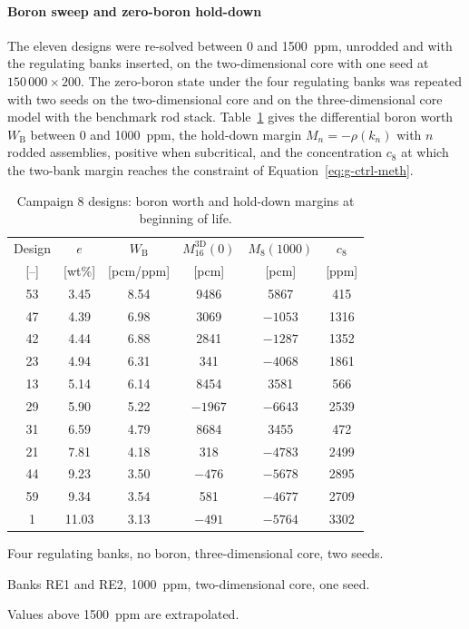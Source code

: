 \paragraph{Boron sweep and zero-boron hold-down}
\label{sec:res-c8-boron}\label{sec:res-c8-zeroboron}

The eleven designs were re-solved between 0 and \SI{1500}{ppm},
unrodded and with the regulating banks inserted, on the
two-dimensional core with one seed at $150\,000\times200$. The
zero-boron state under the four regulating banks was repeated with two
seeds on the two-dimensional core and on the three-dimensional core
model with the benchmark rod stack. Table~\ref{tab:c8-post-boron} gives
the differential boron worth $W_\mathrm{B}$ between 0 and
\SI{1000}{ppm}, the hold-down margin $M_n = -\rho(k_n)$ with $n$
rodded assemblies, positive when subcritical, and the concentration
$c_8$ at which the two-bank margin reaches the constraint of
Equation~\eqref{eq:g-ctrl-meth}.

\begin{table}[htbp]
  \centering
  \small
  \begin{threeparttable}
  \caption{Campaign 8 designs: boron worth and hold-down margins at beginning of life.}
  \label{tab:c8-post-boron}
  \begin{tabular}{@{}cccccc@{}}
    \toprule
    Design & $e$ & $W_\mathrm{B}$ & $M_{16}^\mathrm{3D}(0)$\tnote{a} &
      $M_8(1000)$\tnote{b} & $c_8$\tnote{c} \\
    {[--]} & [wt\%] & [pcm/ppm] & [pcm] & [pcm] & [ppm] \\
    \midrule
    53 & 3.45  & 8.54 & 9486    & 5867    & 415 \\
    47 & 4.39  & 6.98 & 3069    & $-1053$ & 1316 \\
    42 & 4.44  & 6.88 & 2841    & $-1287$ & 1352 \\
    23 & 4.94  & 6.31 & 341     & $-4068$ & 1861 \\
    13 & 5.14  & 6.14 & 8454    & 3581    & 566 \\
    29 & 5.90  & 5.22 & $-1967$ & $-6643$ & 2539 \\
    31 & 6.59  & 4.79 & 8684    & 3455    & 472 \\
    21 & 7.81  & 4.18 & 318     & $-4783$ & 2499 \\
    44 & 9.23  & 3.50 & $-476$  & $-5678$ & 2895 \\
    59 & 9.34  & 3.54 & 581     & $-4677$ & 2709 \\
    1  & 11.03 & 3.13 & $-491$  & $-5764$ & 3302 \\
    \bottomrule
  \end{tabular}
  \begin{tablenotes}[flushleft]\footnotesize
    \item[a] Four regulating banks, no boron, three-dimensional core, two seeds.
    \item[b] Banks RE1 and RE2, \SI{1000}{ppm}, two-dimensional core, one seed.
    \item[c] Values above \SI{1500}{ppm} are extrapolated.
  \end{tablenotes}
  \end{threeparttable}
\end{table}

